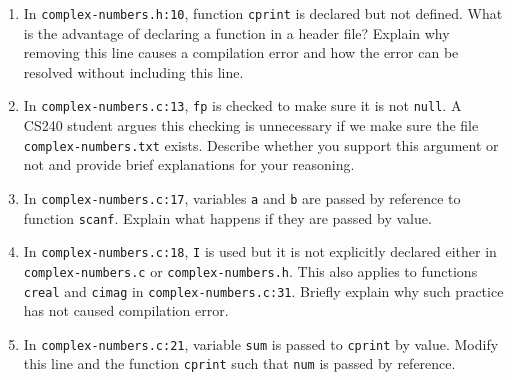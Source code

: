 \begin{enumerate}
\item
In \texttt{complex-numbers.h:10}, function \texttt{cprint} is declared but not defined.
What is the advantage of declaring a function in a header file?
Explain why removing this line causes a compilation error and how the error can be resolved without including this line.

\item
In \texttt{complex-numbers.c:13}, \texttt{fp} is checked to make sure it is not \texttt{null}.
A CS240 student argues this checking is unnecessary if we make sure the file \texttt{complex-numbers.txt} exists.
Describe whether you support this argument or not and provide brief explanations for your reasoning.

\item
In \texttt{complex-numbers.c:17}, variables \texttt{a} and \texttt{b} are passed by reference to function \texttt{scanf}.
Explain what happens if they are passed by value.

\item
In \texttt{complex-numbers.c:18}, \texttt{I} is used but it is not explicitly declared either in \texttt{complex-numbers.c} or \texttt{complex-numbers.h}.
This also applies to functions \texttt{creal} and \texttt{cimag} in \texttt{complex-numbers.c:31}.
Briefly explain why such practice has not caused compilation error.

\item
In \texttt{complex-numbers.c:21}, variable \texttt{sum} is passed to \texttt{cprint} by value. Modify this line and the function \texttt{cprint} such that \texttt{num} is passed by reference.

\end{enumerate}
